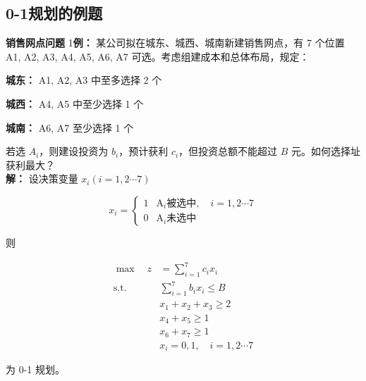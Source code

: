     \subsection{0-1规划的例题}
    \begin{exbox}{\textbf{销售网点问题}}
    1\textbf{例：} 某公司拟在城东、城西、城南新建销售网点，有 7 个位置 A1, A2, A3, A4, A5, A6, A7 可选。考虑组建成本和总体布局，规定：

    \textbf{城东：} A1, A2, A3 中至多选择 2 个

    \textbf{城西：} A4, A5 中至少选择 1 个

    \textbf{城南：} A6, A7 至少选择 1 个

    若选 $A_i$，则建设投资为 $b_i$，预计获利 $c_i$，但投资总额不能超过 $B$ 元。如何选择址获利最大？
    \\
    \textbf{解：} 设决策变量 $x_i(i=1,2\cdots 7)$

    \begin{center}
    \begin{equation*}
    x_i = 
    \begin{cases} 
    1 & \text{A}_i \text{被选中}, \quad i=1,2\cdots 7 \\
    0 & \text{A}_i \text{未选中}
    \end{cases}
    \end{equation*}
    \end{center}

    则

    \begin{align*}
    \max \quad z &= \sum_{i=1}^7 c_i x_i \\
    \text{s.t.} \quad & \sum_{i=1}^7 b_i x_i \leq B \\
    & x_1 + x_2 + x_3 \geq 2 \\
    & x_4 + x_5 \geq 1 \\
    & x_6 + x_7 \geq 1 \\
    & x_i = 0,1, \quad i=1,2\cdots 7
    \end{align*}

    为 0-1 规划。
    \end{exbox}

